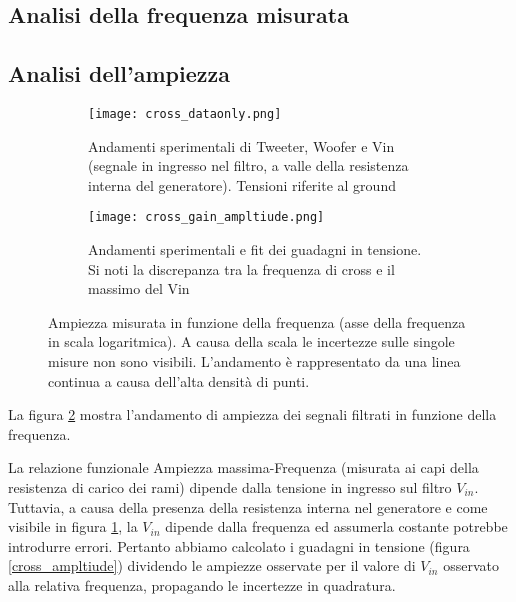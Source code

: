 \documentclass[../Relazione_circuiti]{subfiles}
\begin{document}
\subsection{Analisi della frequenza misurata}

\subsection{Analisi dell'ampiezza}

\begin{figure}[H]
\centering

\begin{subfigure}{=0.5\textwidth}

\texttt{[image: cross\_dataonly.png]}

\caption{Andamenti sperimentali di Tweeter, Woofer e Vin (segnale in ingresso nel filtro, a valle della resistenza interna del generatore). Tensioni riferite al ground}
\label{fig: amplitude_dataonly}

\end{subfigure}

\begin{subfigure}{=0.5\textwidth}

    \texttt{[image: cross\_gain\_ampltiude.png]}

    \caption{Andamenti sperimentali e fit dei guadagni in tensione. Si noti la discrepanza tra la frequenza di cross e il massimo del Vin}
    
    \end{subfigure}

\caption{Ampiezza misurata in funzione della frequenza (asse della frequenza in scala logaritmica). A causa della scala le incertezze sulle singole misure non sono visibili. L'andamento è rappresentato da una linea continua a causa dell'alta densità di punti.}
\label{fig: cross_amplitude}

\end{figure}

La figura \ref{fig: cross_amplitude} mostra l'andamento di ampiezza dei segnali filtrati in funzione della frequenza. 

La relazione funzionale Ampiezza massima-Frequenza (misurata ai capi della resistenza di carico dei rami) dipende dalla tensione in ingresso sul filtro $V_{in}$.
Tuttavia, a causa della presenza della resistenza interna nel generatore e come visibile in figura \ref{fig: amplitude_dataonly}, la $V_{in}$ dipende dalla frequenza ed assumerla costante potrebbe introdurre errori.
Pertanto abbiamo calcolato i guadagni in tensione (figura \ref{cross_ampltiude}) dividendo le ampiezze osservate per il valore di $V_{in}$ osservato alla relativa frequenza, propagando le incertezze in quadratura.
\end{document}
